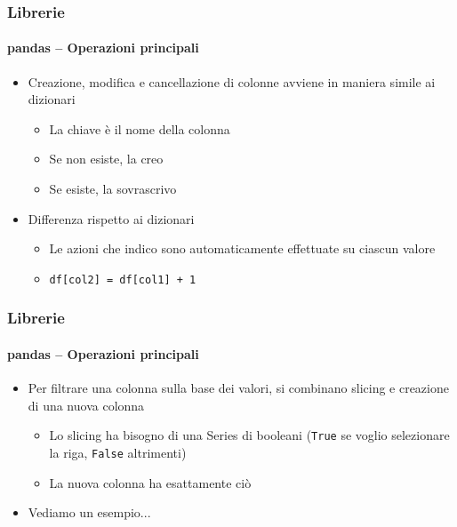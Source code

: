 \begin{contentframe}
    \frametitle{Librerie}
    \framesubtitle{pandas -- Operazioni principali}

    \begin{itemize}
        \item Creazione, modifica e cancellazione di colonne avviene in maniera simile ai dizionari
        \begin{itemize}
            \item La chiave è il nome della colonna
            \item Se non esiste, la creo
            \item Se esiste, la sovrascrivo
        \end{itemize}

        \bigskip
        \item Differenza rispetto ai dizionari
        \begin{itemize}
            \item Le azioni che indico sono automaticamente effettuate su ciascun valore
            \item \texttt{df[\textquotesingle{}col2\textquotesingle{}] = df[\textquotesingle{}col1\textquotesingle{}] + 1}
        \end{itemize}
    \end{itemize}
\end{contentframe}

\begin{contentframe}
    \frametitle{Librerie}
    \framesubtitle{pandas -- Operazioni principali}

    \begin{itemize}
        \item Per filtrare una colonna sulla base dei valori, si combinano slicing e creazione di una nuova colonna
        \begin{itemize}
            \item Lo slicing ha bisogno di una Series di booleani (\texttt{True} se voglio selezionare la riga, \texttt{False} altrimenti)
            \item La nuova colonna ha esattamente ciò
        \end{itemize}

        \bigskip
        \item Vediamo un esempio...
    \end{itemize}
\end{contentframe}

